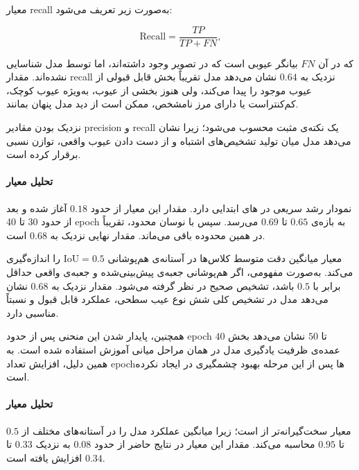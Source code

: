 \documentclass[a4paper, 10pt, twocolumn]{article}
\begin{document}
	معیار recall به‌صورت زیر تعریف می‌شود:
	
	\begin{latin}
		\begin{equation}
			\text{Recall} =
			\frac{TP}{TP + FN},
		\end{equation}
	\end{latin}
	
	که در آن $FN$ بیانگر عیوبی است که در تصویر وجود داشته‌اند، اما توسط مدل شناسایی نشده‌اند. مقدار recall نزدیک به $0.64$ نشان می‌دهد مدل تقریباً بخش قابل قبولی از عیوب موجود را پیدا می‌کند، ولی هنوز بخشی از عیوب، به‌ویژه عیوب کوچک، کم‌کنتراست یا دارای مرز نامشخص، ممکن است از دید مدل پنهان بمانند.
	
	نزدیک بودن مقادیر precision و recall یک نکته‌ی مثبت محسوب می‌شود؛ زیرا نشان می‌دهد مدل میان تولید تشخیص‌های اشتباه و از دست دادن عیوب واقعی، توازن نسبی برقرار کرده است.
	
	\paragraph{تحلیل معیار }
	
	نمودار  رشد سریعی در های ابتدایی دارد. مقدار این معیار از حدود $0.18$ آغاز شده و بعد از حدود 30 تا 40 epoch به بازه‌ی $0.65$ تا $0.69$ می‌رسد. سپس با نوسان محدود، تقریباً در همین محدوده باقی می‌ماند. مقدار نهایی  نزدیک به $0.68$ است.
	
	معیار  میانگین دقت متوسط کلاس‌ها در آستانه‌ی هم‌پوشانی $\mathrm{IoU}=0.5$ را اندازه‌گیری می‌کند. به‌صورت مفهومی، اگر هم‌پوشانی جعبه‌ی پیش‌بینی‌شده و جعبه‌ی واقعی حداقل برابر با $0.5$ باشد، تشخیص صحیح در نظر گرفته می‌شود. مقدار نزدیک به $0.68$ نشان می‌دهد مدل در تشخیص کلی شش نوع عیب سطحی، عملکرد قابل قبول و نسبتاً مناسبی دارد.
	
	همچنین، پایدار شدن این منحنی پس از حدود epoch $40$ تا $50$ نشان می‌دهد بخش عمده‌ی ظرفیت یادگیری مدل در همان مراحل میانی آموزش استفاده شده است. به همین دلیل، افزایش تعداد epochها پس از این مرحله بهبود چشمگیری در  ایجاد نکرده است.
	
	\paragraph{تحلیل معیار }
	
	معیار  سخت‌گیرانه‌تر از  است؛ زیرا میانگین عملکرد مدل را در آستانه‌های مختلف  از $0.5$ تا $0.95$ محاسبه می‌کند. مقدار این معیار در نتایج حاضر از حدود $0.08$ به نزدیک $0.33$ تا $0.34$ افزایش یافته است.
	
\end{document}
